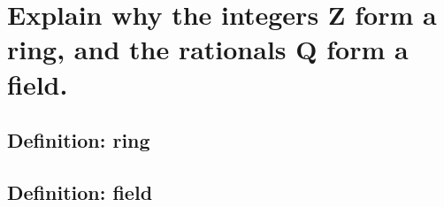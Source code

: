 \section{Explain why the integers Z form a ring, and the rationals Q form a field.}

\subsection{Definition: ring}




\subsection{Definition: field}
